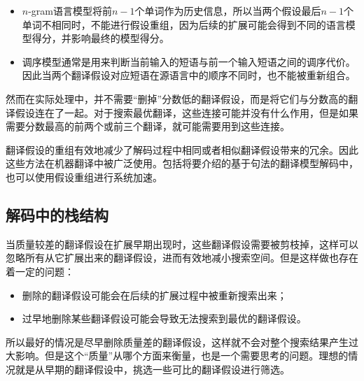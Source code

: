 \begin{itemize}
\vspace{0.5em}
\item $n$-gram语言模型将前$n-1$个单词作为历史信息，所以当两个假设最后$n-1$个单词不相同时，不能进行假设重组，因为后续的扩展可能会得到不同的语言模型得分，并影响最终的模型得分。
\vspace{0.5em}
\item 调序模型通常是用来判断当前输入的短语与前一个输入短语之间的调序代价。因此当两个翻译假设对应短语在源语言中的顺序不同时，也不能被重新组合。
\vspace{0.5em}
\end{itemize}

\parinterval 然而在实际处理中，并不需要“删掉”分数低的翻译假设，而是将它们与分数高的翻译假设连在了一起。对于搜索最优翻译，这些连接可能并没有什么作用，但是如果需要分数最高的前两个或前三个翻译，就可能需要用到这些连接。

\parinterval 翻译假设的重组有效地减少了解码过程中相同或者相似翻译假设带来的冗余。因此这些方法在机器翻译中被广泛使用。包括{\chaptereight}将要介绍的基于句法的翻译模型解码中，也可以使用假设重组进行系统加速。


\subsection{解码中的栈结构}

\parinterval 当质量较差的翻译假设在扩展早期出现时，这些翻译假设需要被剪枝掉，这样可以忽略所有从它扩展出来的翻译假设，进而有效地减小搜索空间。但是这样做也存在着一定的问题：

\begin{itemize}
\vspace{0.5em}
\item 删除的翻译假设可能会在后续的扩展过程中被重新搜索出来；
\vspace{0.5em}
\item 过早地删除某些翻译假设可能会导致无法搜索到最优的翻译假设。
\vspace{0.5em}
\end{itemize}

所以最好的情况是尽早删除质量差的翻译假设，这样就不会对整个搜索结果产生过大影响。但是这个“质量”从哪个方面来衡量，也是一个需要思考的问题。理想的情况就是从早期的翻译假设中，挑选一些可比的翻译假设进行筛选。

